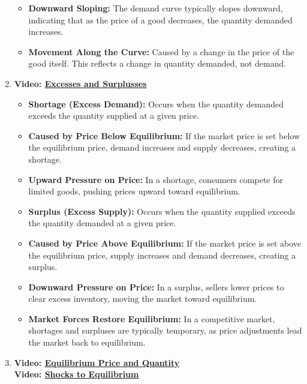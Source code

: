 \documentclass[
]{book}
\providecommand{\tightlist}{%
  \setlength{\itemsep}{0pt}\setlength{\parskip}{0pt}}
\begin{document}
\begin{enumerate}
  \begin{itemize}
  \tightlist
  \item
    \textbf{Downward Sloping:} The demand curve typically slopes downward, indicating that as the price of a good decreases, the quantity demanded increases.
  \item
    \textbf{Movement Along the Curve:} Caused by a change in the price of the good itself. This reflects a change in quantity demanded, not demand.
  \end{itemize}
\item
  \textbf{Video: \href{https://www.youtube.com/watch?v=7eZcPs9z9OA}{Excesses and Surplusses}}

  \begin{itemize}
  \tightlist
  \item
    \textbf{Shortage (Excess Demand):} Occurs when the quantity demanded exceeds the quantity supplied at a given price.\\
  \item
    \textbf{Caused by Price Below Equilibrium:} If the market price is set below the equilibrium price, demand increases and supply decreases, creating a shortage.\\
  \item
    \textbf{Upward Pressure on Price:} In a shortage, consumers compete for limited goods, pushing prices upward toward equilibrium.
  \item
    \textbf{Surplus (Excess Supply):} Occurs when the quantity supplied exceeds the quantity demanded at a given price.
  \item
    \textbf{Caused by Price Above Equilibrium:} If the market price is set above the equilibrium price, supply increases and demand decreases, creating a surplus.
  \item
    \textbf{Downward Pressure on Price:} In a surplus, sellers lower prices to clear excess inventory, moving the market toward equilibrium.
  \item
    \textbf{Market Forces Restore Equilibrium:} In a competitive market, shortages and surpluses are typically temporary, as price adjustments lead the market back to equilibrium.
  \end{itemize}
\item
  \textbf{Video: \href{https://www.youtube.com/watch?v=7eZcPs9z9OA&list=PL-uRhZ_p-BM49QD09RNNJItpiiMGP4GUI&index=3}{Equilibrium Price and Quantity}}\\
  \textbf{Video: \href{https://www.youtube.com/watch?v=6dwSIO_Slhc}{Shocks to Equilibrium}}


\end{enumerate}
\end{document}
